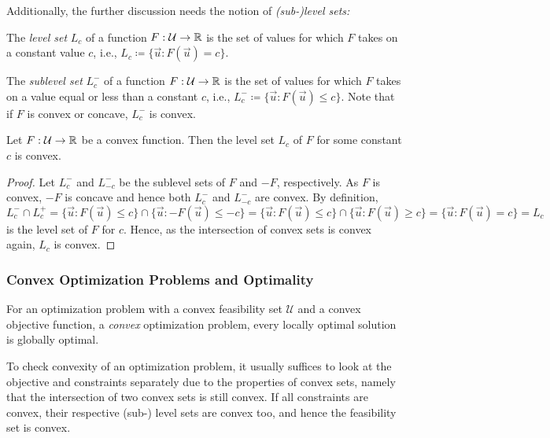 			Additionally, the further discussion needs the notion of \emph{(sub-)level sets:}
			\begin{definition}
				The \emph{level set} \(L_c\) of a function \( F : \mathcal{U} \to \mathbb{R} \) is the set of values for which \(F\) takes on a constant value \(c\), i.e., \( L_c \coloneqq \{ \vec{u} : F(\vec{u}) = c \} \).
			\end{definition}
			\begin{definition}
				The \emph{sublevel set} \(L_c^-\) of a function \( F : \mathcal{U} \to \mathbb{R} \) is the set of values for which \(F\) takes on a value equal or less than a constant \(c\), i.e., \( L_c^- \coloneqq \{ \vec{u} : F(\vec{u}) \leq c \} \). Note that if \(F\) is convex or concave, \(L_c^-\) is convex.
			\end{definition}
			\begin{theorem}
				Let \( F : \mathcal{U} \to \mathbb{R} \) be a convex function. Then the level set \(L_c\) of \(F\) for some constant \(c\) is convex.
			\end{theorem}
			\begin{proof}
				Let \(L_c^-\) and \(L_{-c}^-\) be the sublevel sets of \(F\) and \(-F\), respectively. As \(F\) is convex, \(-F\) is concave and hence both \(L_c^-\) and \(L_{-c}^-\) are convex. By definition, \( L_c^- \cap L_c^+ = \{ \vec{u} : F(\vec{u}) \leq c \} \cap \{ \vec{u} : -F(\vec{u}) \leq -c \} = \{ \vec{u} : F(\vec{u}) \leq c \} \cap \{ \vec{u} : F(\vec{u}) \geq c \} = \{ \vec{u} : F(\vec{u}) = c \} = L_c \) is the level set of \(F\) for \(c\). Hence, as the intersection of convex sets is convex again, \(L_c\) is convex.
			\end{proof}

			\subsubsection{Convex Optimization Problems and Optimality}
				\begin{theorem}
					For an optimization problem with a convex feasibility set \( \mathcal{U} \) and a convex objective function, a \emph{convex} optimization problem, every locally optimal solution is globally optimal.
				\end{theorem}

				To check convexity of an optimization problem, it usually suffices to look at the objective and constraints separately due to the properties of convex sets, namely that the intersection of two convex sets is still convex. If all constraints are convex, their respective (sub-) level sets are convex too, and hence the feasibility set is convex.

